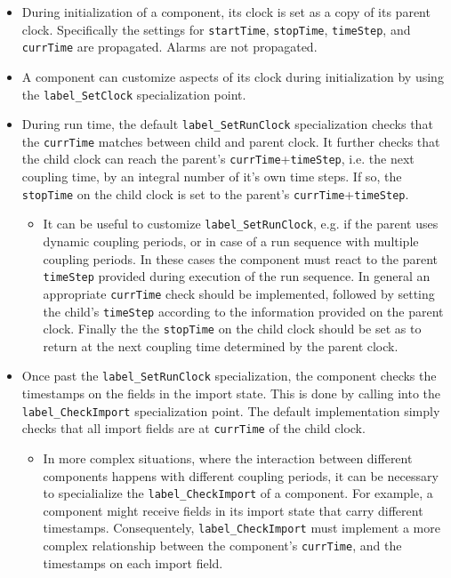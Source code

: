 \begin{itemize}
\item During initialization of a component, its clock is set as a copy of its parent clock. Specifically the settings for {\tt startTime}, {\tt stopTime}, {\tt timeStep}, and {\tt currTime} are propagated. Alarms are not propagated.
\item A component can customize aspects of its clock during initialization by using the {\tt label\_SetClock} specialization point.
\item During run time, the default {\tt label\_SetRunClock} specialization checks that the {\tt currTime} matches between child and parent clock. It further checks that the child clock can reach the parent's {\tt currTime}+{\tt timeStep}, i.e. the next coupling time, by an integral number of it's own time steps. If so, the {\tt stopTime} on the child clock is set to the parent's {\tt currTime}+{\tt timeStep}.
\begin{itemize}
\item It can be useful to customize {\tt label\_SetRunClock}, e.g. if the parent uses dynamic coupling periods, or in case of a run sequence with multiple coupling periods. In these cases the component must react to the parent {\tt timeStep} provided during execution of the run sequence. In general an appropriate {\tt currTime} check should be implemented, followed by setting the child's {\tt timeStep} according to the information provided on the parent clock. Finally the the {\tt stopTime} on the child clock should be set as to return at the next coupling time determined by the parent clock.
\end{itemize}
\item Once past the {\tt label\_SetRunClock} specialization, the component checks the timestamps on the fields in the import state. This is done by calling into the {\tt label\_CheckImport} specialization point. The default implementation simply checks that all import fields are at {\tt currTime} of the child clock. 
\begin{itemize}
\item In more complex situations, where the interaction between different components happens with different coupling periods, it can be necessary to specialialize the {\tt label\_CheckImport} of a component. For example, a component might receive fields in its import state that carry different timestamps. Consequentely, {\tt label\_CheckImport} must implement a more complex relationship between the component's {\tt currTime}, and the timestamps on each import field.

\end{itemize}
\end{itemize}
